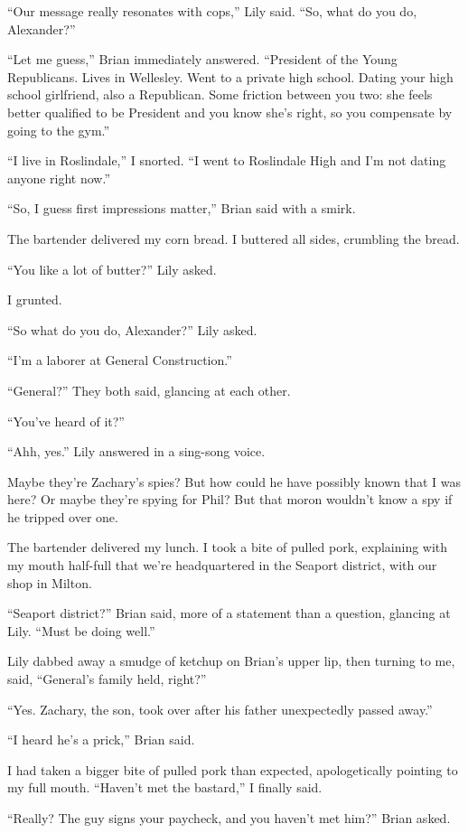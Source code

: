 ``Our message really resonates with cops,'' Lily said. ``So, what do you
do, Alexander?''

``Let me guess,'' Brian immediately answered. ``President of the Young
Republicans. Lives in Wellesley. Went to a private high school. Dating
your high school girlfriend, also a Republican. Some friction between
you two: she feels better qualified to be President and you know she's
right, so you compensate by going to the gym.''

``I live in Roslindale,'' I snorted. ``I went to Roslindale High and I'm
not dating anyone right now.''

``So, I guess first impressions matter,'' Brian said with a smirk.

The bartender delivered my corn bread. I buttered all sides, crumbling
the bread.

``You like a lot of butter?'' Lily asked.

I grunted.

``So what do you do, Alexander?'' Lily asked.

``I'm a laborer at General Construction.''

``General?'' They both said, glancing at each other.

``You've heard of it?''

``Ahh, yes.'' Lily answered in a sing-song voice.

Maybe they're Zachary's spies? But how could he have possibly known that
I was here? Or maybe they're spying for Phil? But that moron wouldn't
know a spy if he tripped over one.

The bartender delivered my lunch. I took a bite of pulled pork,
explaining with my mouth half-full that we're headquartered in the
Seaport district, with our shop in Milton.

``Seaport district?'' Brian said, more of a statement than a question,
glancing at Lily. ``Must be doing well.''

Lily dabbed away a smudge of ketchup on Brian's upper lip, then turning
to me, said, ``General's family held, right?''

``Yes. Zachary, the son, took over after his father unexpectedly passed
away.''

``I heard he's a prick,'' Brian said.

I had taken a bigger bite of pulled pork than expected, apologetically
pointing to my full mouth. ``Haven't met the bastard,'' I finally said.

``Really? The guy signs your paycheck, and you haven't met him?'' Brian
asked.

